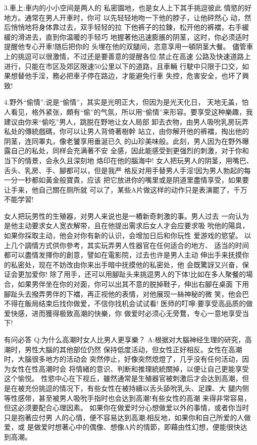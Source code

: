 \documentclass[12pt,UTF8]{ctexbook}
\begin{document}
3.車上:車内的小小空间是两人的
私密園地，也是女人上下其手挑逗彼此
情慾的好地方。通常在男人开車时，你可
以先轻轻地吻一下他的脖子，让他砰然心
动，然后悄悄地将身体靠过去，双手轻轻的拉
下他裤子的拉鍊，松开他的裤襠，右手緩緩的滑进去，直到你温暖的手轻巧
地握著他迅速膨脹的阴茎，这时，你必须适时提醒他专心开車!随后把你的
头埋在他的双腿间，恣意享用一頓阴茎大餐。
儘管車上的挑逗可以很激情，不过还是要善意的提醒各位:禁止在高速
公路及快速道路上进行，只能在市区及郊区限速50公里以下的道路，且車輛
行駛中只限于口交，如果想替他手淫，務必把車子停在路边，才能避免行車
失控，危害安全，也坏了興致!

4.野外“偷情”:说是“偷情”，其实是光明正大，但因为是光天化日，
天地无盖，怕人看见，格外紧张，頗有“偷”的气氛，所以用“偷情”来形容。要享受这种樂趣，我建议由你来“偷吃”男人，跳脱在野地让女人局部
卸去衣物，由男人吸吮乳房玩弄私处的傳統戲碼，你可以让男人背倚著樹幹
站立，由你解开他的裤襠，掏出他的阴茎，连同睪丸，像老饕享用垂涎已久
的山珍美味般。此刻，男人因为在野外曝露自己的私处，同样会充满著不安
全感，因此能感受到更强烈的刺激，对于你和当下的情景，会永久且深刻地
烙印在他的腦海中!
女人把玩男人的阴茎，用嘴巴、舌头、乳房、手、腳都可以，但是我严
格反对用手替男人手淫!因为男人勃起的每一分一秒都如黃金般寶貴，应该
把它放进你的嘴里或是阴道里盡情享受，如果要让手来，他自己關在厕所就
可以了，某些A片做这样的动作只是表演罷了，千万不能学習!

女人把玩男性的生殖器，对男人来说也是一樁新奇刺激的事。男人过去
一向认为是他主动要求女人宽衣解带，且在他提出需求后女人才会应要求吸
吮他的陽具，如果你採取主动，他会对你有新的认识，会增加日后和你玩性
爱游戏的慾望。
以上几个調情方式供你參考，其实玩弄男人性器官在任何适合的地方、
适当的时间都可以盡情发揮你的創意，譬如在電影院，过去也许是男人主动
伸出手来抚摸你的私密处，现在不妨改由你来出手暗中抚摸他的私密处，他
会既驚訝又兴奋，保证会更加爱你!
除了用手，还可以用腳趾头来挑逗男人的下体!比如在多人聚餐的場
合，如果男伴坐在你的对面，你可以出其不意的脱掉鞋子，伸出右腳在桌面
下用腳趾头去撥弄男伴的下襠，再正视他的表情，对他展现一絲神秘的微
笑，他会巴不得在飯局结束后找你做爱，不信你找机会试试看!
医师的叮嚀:要享受高品质的做爱快感，进而獲得极致高潮的快樂，你
做爱时必须心无旁鶩，专心一意地享受当下!

有问必答
Q:为什么高潮时女人比男人更享樂？
A:根据对大腦神经生理的研究，高潮时，男性大腦的其他部位仍然
保持低度活动，但女性正好相反。女性在高潮时，大腦很多地方的活动会
突然停止，好像突然熄燈了，几乎没有任何活动，因为女性在性高潮时会
将情緒的意识、判断和推理統統關掉，以便让自己更能享受这个愉悦。
性慾中心在下视丘，雖然通常是生殖器官被刺激后才会达到高潮，但
是在被充份挑逗的情况下，有些女性在被持續以舌头舔吮乳头、足踝、大
腿内侧等性感带，甚至被男人吸吮手指时也会达到高潮!有些女性的高潮
来得非常容易，但这必须要配合心理因素。
如果你在做爱时分心想做爱以外的事情，或者你当时只是抱著应付男
人的心情，便不容易达到高潮;相反地，如果你和自己所爱的人做爱，或
是做爱时想著心中的偶像、想像A片的情節，即藉由性幻想，便能很快达
到高潮。
\end{document}
